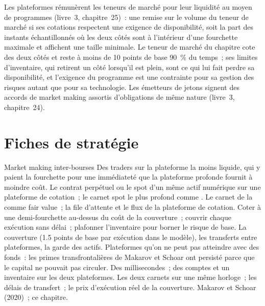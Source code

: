 Les plateformes rémunèrent les teneurs de marché pour leur liquidité au moyen de programmes (livre~3, chapitre~25)~: une remise sur le volume du teneur de marché si ses cotations respectent une exigence de
disponibilité, soit la part des instants échantillonnés où les deux côtés sont à l'intérieur d'une fourchette maximale et affichent une taille minimale. Le teneur de marché du chapitre cote des deux côtés
et reste à moins de 10 points de base 90~\% du temps~; ses limites d'inventaire, qui retirent un côté lorsqu'il est plein, sont ce qui lui fait perdre sa disponibilité, et
l'exigence du programme est une contrainte pour sa gestion des risques autant que pour sa technologie. Les émetteurs de jetons signent des accords de market making assortis d'obligations de
même nature (livre~3, chapitre~24).

\section{Fiches de stratégie}

\begin{strategyfile}{Market making inter-bourses}\label{strat:hf:crypto-high-frequency-trading-on-centralised-venues:xmm}
 Des traders sur la plateforme la moins liquide, qui y paient la fourchette pour une immédiateté que la plateforme profonde fournit à moindre coût.
 Le contrat perpétuel ou le spot d'un même actif numérique sur une plateforme de cotation~; le carnet spot le plus profond comme .
 Le carnet de la  comme fair value~; la file d'attente et le flux de la plateforme de cotation.
 Coter à une demi-fourchette au-dessus du coût de la couverture~; couvrir chaque exécution sans délai~; plafonner l'inventaire pour borner le risque de base.
 La couverture (1.5 points de base par exécution dans le modèle), les transferts entre plateformes, la garde des actifs.
 Plateformes qu'on ne peut pas atteindre avec des fonds~: les primes transfrontalières de Makarov et Schoar ont persisté parce que le capital ne pouvait pas circuler.
 Des millisecondes~; des comptes et un inventaire sur les deux plateformes.
 Les deux carnets sur une même horloge~; les délais de transfert~; le prix d'exécution réel de la couverture.
 Makarov et Schoar (2020)~; ce chapitre.
\end{strategyfile}

